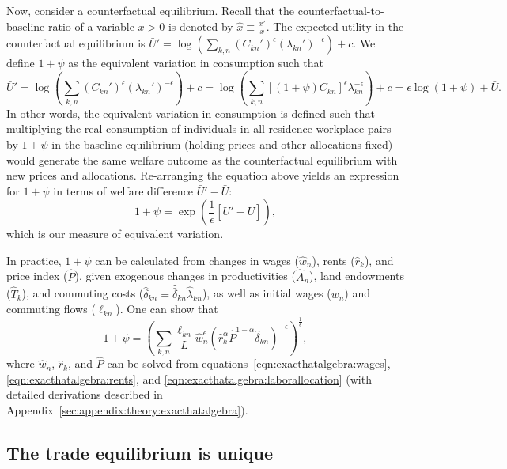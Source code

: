 \documentclass[11pt]{article}
\theoremstyle{definition}
\begin{document}
Now, consider a counterfactual equilibrium.
Recall that the counterfactual-to-baseline ratio of a variable $x>0$ is denoted by $\hat{x}\equiv \frac{x'}{x}$.
The expected utility in the counterfactual equilibrium is $\bar{U}' = \log \left( \sum_{k,n} (C_{kn}')^\epsilon (\lambda_{kn}')^{-\epsilon} \right) + c$. 
We define $1+\psi$ as the equivalent variation in consumption such that
\begin{equation*}
  \bar{U}' = \log \left( \sum_{k,n} (C_{kn}')^\epsilon (\lambda_{kn}')^{-\epsilon} \right) + c = \log \left( \sum_{k,n} \left[ (1+\psi) C_{kn} \right]^\epsilon \lambda_{kn}^{-\epsilon} \right) + c = \epsilon \log(1+\psi) + \bar{U}.
\end{equation*}
In other words, the equivalent variation in consumption is defined such that
multiplying the real consumption of individuals in all residence-workplace pairs by $1+\psi$
in the baseline equilibrium (holding prices and other allocations fixed) would generate the same welfare outcome
as the counterfactual equilibrium with new prices and allocations. 
Re-arranging the equation above yields an expression for $1+\psi$ in terms of welfare difference $\bar{U}' - \bar{U}$:
\begin{equation*}
  1+\psi = \exp \left( \frac{1}{\epsilon} \left[ \bar{U}' - \bar{U} \right] \right),
\end{equation*}
which is our measure of equivalent variation.

In practice, $1+\psi$ can be calculated from changes in wages ($\hat{w}_n$), rents ($\hat{r}_k$), and price index ($\hat{P}$),
given exogenous changes in productivities ($\hat{A}_n$), land endowments ($\hat{T}_k$), and commuting costs ($\hat{\delta}_{kn} = \hat{\bar{\delta}}_{kn} \hat{\lambda}_{kn}$), 
as well as initial wages ($w_n$) and commuting flows ($\ell_{kn}$).
One can show that
\begin{equation} \label{eqn:welfare:equivalentvariation}
  1+\psi = \left( \sum_{k,n} \frac{\ell_{kn}}{L} \hat{w}_n^\epsilon \left( \hat{r}_k^\alpha \hat{P}^{1-\alpha} \hat{\delta}_{kn} \right)^{-\epsilon} \right)^{\frac{1}{\epsilon}},
\end{equation}
where $\hat{w}_n$, $\hat{r}_k$, and $\hat{P}$ can be solved from equations~\eqref{eqn:exacthatalgebra:wages}, \eqref{eqn:exacthatalgebra:rents}, and \eqref{eqn:exacthatalgebra:laborallocation}
(with detailed derivations described in Appendix~\ref{sec:appendix:theory:exacthatalgebra}).

\subsection{The trade equilibrium is unique}\label{sec:appendix:theory:finite:tradeeqlbmunique}
\end{document}
